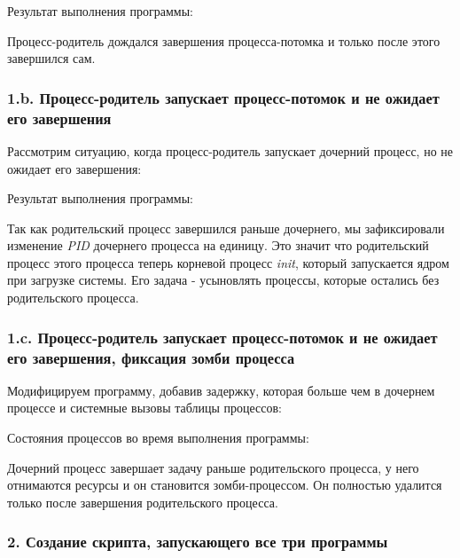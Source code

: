 \documentclass[14pt,a4paper,report]{report}
\begin{document}


Результат выполнения программы:



Процесс-родитель дождался завершения процесса-потомка и только после этого завершился сам.

\subsubsection{1.b. Процесс-родитель запускает процесс-потомок и не ожидает его завершения}

Рассмотрим ситуацию, когда процесс-родитель запускает дочерний процесс, но не ожидает его завершения:



Результат выполнения программы:



Так как родительский процесс завершился раньше дочернего, мы зафиксировали изменение \emph{PID} дочернего процесса на единицу. Это значит что родительский процесс этого процесса теперь корневой процесс \emph{init}, который запускается ядром при загрузке системы. Его задача - усыновлять процессы, которые остались без родительского процесса.

\subsubsection{1.c. Процесс-родитель запускает процесс-потомок и не ожидает его завершения, фиксация зомби процесса}

Модифицируем программу, добавив задержку, которая больше чем в дочернем процессе и системные вызовы таблицы процессов:



Состояния процессов во время выполнения программы:



Дочерний процесс завершает задачу раньше родительского процесса, у него отнимаются ресурсы и он становится зомби-процессом. Он полностью удалится только после завершения родительского процесса.

\subsubsection{2. Создание скрипта, запускающего все три программы}
\end{document}

